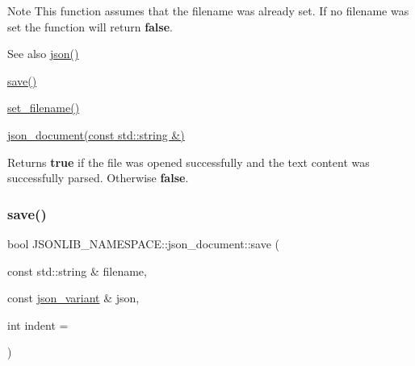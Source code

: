 \begin{DoxyNote}{Note}
This function assumes that the {\ttfamily filename} was already set. If no {\ttfamily filename} was set the function will return {\bfseries false}. 
\end{DoxyNote}
\begin{DoxySeeAlso}{See also}
\hyperlink{classJSONLIB__NAMESPACE_1_1json__document_ad87b8e7d68ba854dbd730758273a3b93}{json()} 

\hyperlink{classJSONLIB__NAMESPACE_1_1json__document_af8f392a0ffc779277ead1f2bdb222930}{save()} 

\hyperlink{classJSONLIB__NAMESPACE_1_1json__document_acc406344661e361c75ac7bc307057712}{set\+\_\+filename()} 

\hyperlink{classJSONLIB__NAMESPACE_1_1json__document_a3295c12f7251f1df5dc5f727a4e5b597}{json\+\_\+document(const std\+::string \&)} 
\end{DoxySeeAlso}
\begin{DoxyReturn}{Returns}
{\bfseries true} if the file was opened successfully and the text content was successfully parsed. Otherwise {\bfseries false}. 
\end{DoxyReturn}
\mbox{\label{classJSONLIB__NAMESPACE_1_1json__document_af8f392a0ffc779277ead1f2bdb222930}} 
\subsubsection{\texorpdfstring{save()}{save()}\hspace{0.1cm}{\footnotesize\ttfamily [1/6]}}
{\footnotesize\ttfamily bool J\+S\+O\+N\+L\+I\+B\+\_\+\+N\+A\+M\+E\+S\+P\+A\+C\+E\+::json\+\_\+document\+::save (\begin{DoxyParamCaption}\item[{const std\+::string \&}]{filename,  }\item[{const \hyperlink{classJSONLIB__NAMESPACE_1_1json__variant}{json\+\_\+variant} \&}]{json,  }\item[{int}]{indent = {} }\end{DoxyParamCaption})\hspace{0.3cm}{\ttfamily [static]}}



